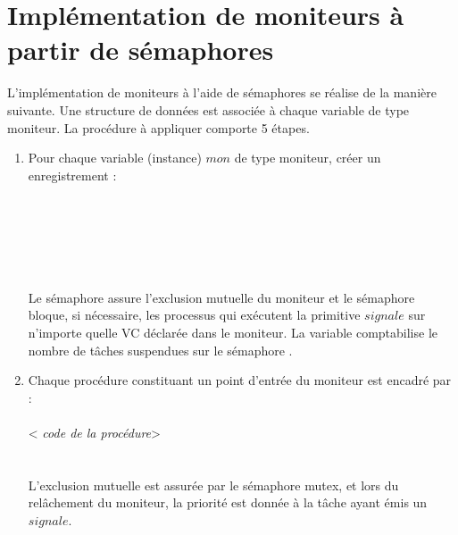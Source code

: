 \section{Implémentation de moniteurs à partir de sémaphores}

L'implémentation de moniteurs à l'aide de sémaphores se réalise de la manière suivante.  Une structure de données est associée à chaque variable de type moniteur.
La procédure à appliquer comporte 5 étapes.
\begin{enumerate}
\item Pour chaque variable (instance) $mon$ de type moniteur, créer un enregistrement : \\
\hspace*{0.3cm} \\
\hspace*{0.7cm} \\
\hspace*{0.7cm} \\
\hspace*{0.7cm} \\
\hspace*{0.3cm} \\
\hspace*{0.3cm} \\
Le sémaphore  assure l'exclusion mutuelle du moniteur et le sémaphore  bloque, si nécessaire, les processus qui exécutent la primitive $signale$ sur n'importe quelle VC déclarée dans le moniteur.  La variable  comptabilise le nombre de tâches suspendues sur le sémaphore .

\item Chaque procédure constituant un point d'entrée du moniteur est encadré par : \\
\hspace*{0.3cm} \\
\hspace*{0.3cm}< {\em code de la procédure}>  \\
\hspace*{0.3cm} \\
\hspace*{0.3cm} \\
L'exclusion mutuelle est assurée par le sémaphore {mutex}, et lors du relâchement du moniteur, la priorité est donnée à la tâche ayant émis un $signale$.


\end{enumerate}
